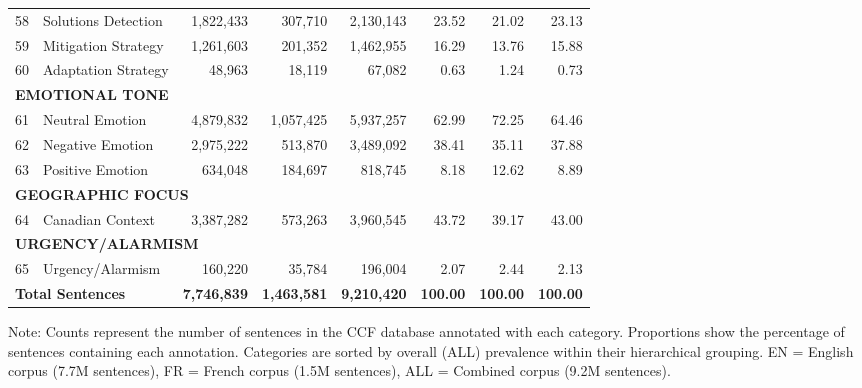 \documentclass[12pt]{article}
\begin{document}
{\begin{longtable}{p{0.5cm}p{5.5cm}rrrrrr}
58 & Solutions Detection & 1,822,433 & 307,710 & 2,130,143 & 23.52 & 21.02 & 23.13 \\
59 & Mitigation Strategy & 1,261,603 & 201,352 & 1,462,955 & 16.29 & 13.76 & 15.88 \\
60 & Adaptation Strategy & 48,963 & 18,119 & 67,082 & 0.63 & 1.24 & 0.73 \\
\midrule
\multicolumn{8}{l}{\cellcolor{gray!10}\textbf{EMOTIONAL TONE}} \\
61 & Neutral Emotion & 4,879,832 & 1,057,425 & 5,937,257 & 62.99 & 72.25 & 64.46 \\
62 & Negative Emotion & 2,975,222 & 513,870 & 3,489,092 & 38.41 & 35.11 & 37.88 \\
63 & Positive Emotion & 634,048 & 184,697 & 818,745 & 8.18 & 12.62 & 8.89 \\
\midrule
\multicolumn{8}{l}{\cellcolor{gray!10}\textbf{GEOGRAPHIC FOCUS}} \\
64 & Canadian Context & 3,387,282 & 573,263 & 3,960,545 & 43.72 & 39.17 & 43.00 \\
\midrule
\multicolumn{8}{l}{\cellcolor{gray!10}\textbf{URGENCY/ALARMISM}} \\
65 & Urgency/Alarmism & 160,220 & 35,784 & 196,004 & 2.07 & 2.44 & 2.13 \\
\bottomrule
\multicolumn{2}{l}{\textbf{Total Sentences}} & \textbf{7,746,839} & \textbf{1,463,581} & \textbf{9,210,420} & \textbf{100.00} & \textbf{100.00} & \textbf{100.00} \\
\bottomrule
\end{longtable}
} %
Note: Counts represent the number of sentences in the CCF database annotated with each category. Proportions show the percentage of sentences containing each annotation. Categories are sorted by overall (ALL) prevalence within their hierarchical grouping. EN = English corpus (7.7M sentences), FR = French corpus (1.5M sentences), ALL = Combined corpus (9.2M sentences).
\endlandscape
\printbibliography[title={References}]
\end{document}
